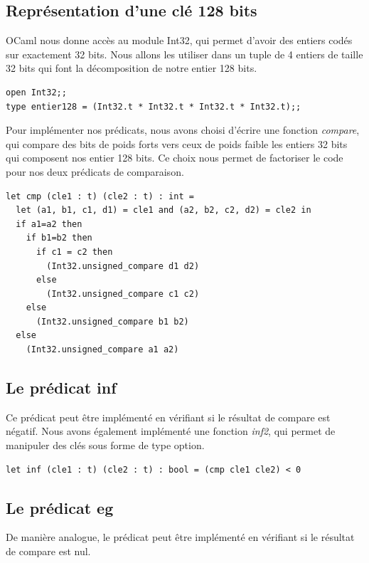 \documentclass[12pt,a4paper]{article}
\begin{document}
\subsection{Représentation d'une clé 128 bits}

OCaml nous donne accès au module Int32, qui permet d'avoir des entiers codés sur exactement 32 bits. Nous allons les utiliser dans un tuple de 4 entiers de taille 32 bits qui font la décomposition de notre entier 128 bits.

\medskip

\begin{lstlisting}
open Int32;;
type entier128 = (Int32.t * Int32.t * Int32.t * Int32.t);;

\end{lstlisting} \medskip


Pour implémenter nos prédicats, nous avons choisi d'écrire une fonction \textit{compare}, qui compare des bits de poids forts vers ceux de poids faible les entiers 32 bits qui composent nos entier 128 bits. Ce choix nous permet de factoriser le code pour nos deux prédicats de comparaison.

\medskip \begin{lstlisting}
let cmp (cle1 : t) (cle2 : t) : int = 
  let (a1, b1, c1, d1) = cle1 and (a2, b2, c2, d2) = cle2 in 
  if a1=a2 then 
    if b1=b2 then 
      if c1 = c2 then
        (Int32.unsigned_compare d1 d2)
      else
        (Int32.unsigned_compare c1 c2)
    else
      (Int32.unsigned_compare b1 b2) 
  else 
    (Int32.unsigned_compare a1 a2)
\end{lstlisting} 

\subsection{Le prédicat inf}

Ce prédicat peut être implémenté en vérifiant si le résultat de compare est négatif. Nous avons également implémenté une fonction \textit{inf2}, qui permet de manipuler des clés sous forme de type option.

\medskip \begin{lstlisting}
let inf (cle1 : t) (cle2 : t) : bool = (cmp cle1 cle2) < 0
\end{lstlisting} 

\subsection{Le prédicat eg}
De manière analogue, le prédicat peut être implémenté en vérifiant si le résultat de compare est nul.
\end{document}
